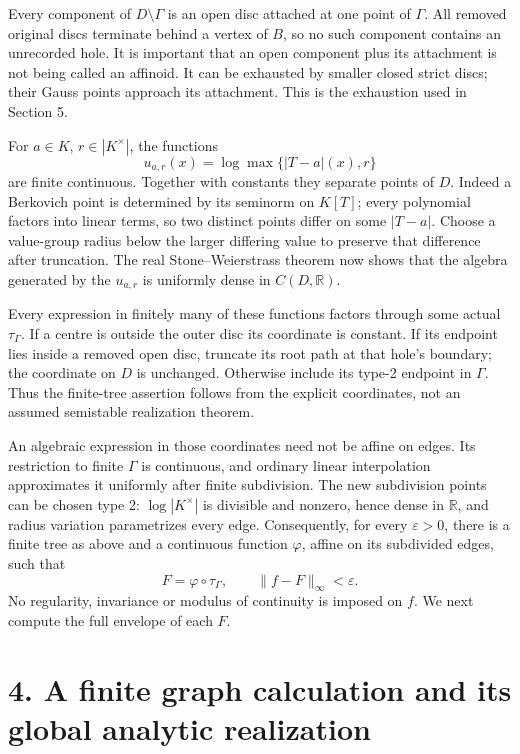 \documentclass[11pt]{article}
\begin{document}
Every component of \(D\setminus\Gamma\) is an open disc attached at one point of \(\Gamma\). All removed original discs terminate behind a vertex of \(B\), so no such component contains an unrecorded hole. It is important that an open component plus its attachment is not being called an affinoid. It can be exhausted by smaller closed strict discs; their Gauss points approach its attachment. This is the exhaustion used in Section 5.

For \(a\in K\), \(r\in|K^\times|\), the functions
\[
u_{a,r}(x)=\log\max\{|T-a|(x),r\}
\]
are finite continuous. Together with constants they separate points of \(D\). Indeed a Berkovich point is determined by its seminorm on \(K[T]\); every polynomial factors into linear terms, so two distinct points differ on some \(|T-a|\). Choose a value-group radius below the larger differing value to preserve that difference after truncation. The real Stone--Weierstrass theorem now shows that the algebra generated by the \(u_{a,r}\) is uniformly dense in \(C(D,\mathbb R)\).

Every expression in finitely many of these functions factors through some actual \(\tau_\Gamma\). If a centre is outside the outer disc its coordinate is constant. If its endpoint lies inside a removed open disc, truncate its root path at that hole's boundary; the coordinate on \(D\) is unchanged. Otherwise include its type-2 endpoint in \(\Gamma\). Thus the finite-tree assertion follows from the explicit coordinates, not an assumed semistable realization theorem.

An algebraic expression in those coordinates need not be affine on edges. Its restriction to finite \(\Gamma\) is continuous, and ordinary linear interpolation approximates it uniformly after finite subdivision. The new subdivision points can be chosen type 2: \(\log|K^\times|\) is divisible and nonzero, hence dense in \(\mathbb R\), and radius variation parametrizes every edge. Consequently, for every \(\varepsilon>0\), there is a finite tree as above and a continuous function \(\varphi\), affine on its subdivided edges, such that
\[
F=\varphi\circ\tau_\Gamma,\qquad \|f-F\|_\infty<\varepsilon.
\tag{3.2}
\]
No regularity, invariance or modulus of continuity is imposed on \(f\). We next compute the full envelope of each \(F\).

\section*{4. A finite graph calculation and its global analytic realization}
\end{document}
